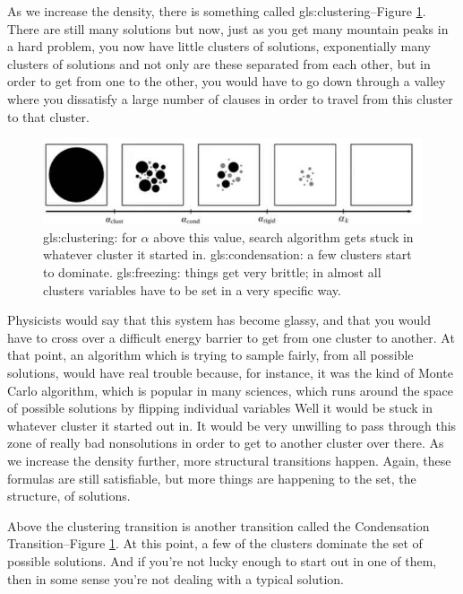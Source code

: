 \documentclass[]{article}
\begin{document}
As we increase the density, there is something called \gls{gls:clustering}--Figure \ref{fig:clustering-transition}. There are still many solutions but now, just as you get many mountain peaks in a hard problem, you now have little clusters of solutions, exponentially many clusters of solutions and not only are these separated from each other, but in order to get from one to the other, you would have to go down through a valley where you  dissatisfy a large number of clauses in order to travel from this cluster to that cluster.


\begin{figure}[H]
	\caption[Clustering, Freezing, and Hardness]{\gls{gls:clustering}: for $\alpha$ above this value, search algorithm gets stuck in whatever cluster it started in. \gls{gls:condensation}: a few clusters start to dominate. \gls{gls:freezing}: things get very brittle; in almost all clusters variables have to be set in a very specific way.}\label{fig:clustering-transition}
	\includegraphics[width=\textwidth]{clustering-transition}
\end{figure}



Physicists would say that this system has become glassy, and that you would have to cross over a difficult energy barrier to get from one cluster to another.
At that point, an algorithm which is trying to sample fairly, from all possible solutions, would have real trouble because, for instance, it was the kind of Monte Carlo algorithm, which is popular in many sciences, which runs around the space of possible solutions by flipping individual variables
Well it would be stuck in whatever cluster it started out in.
It would be very unwilling to pass through this zone of really bad nonsolutions in order to get to another cluster over there.
As we increase the density further, more structural transitions happen.
Again, these formulas are still satisfiable, but more things are happening to the set,
the structure, of solutions.

Above the clustering transition is another transition called the Condensation Transition--Figure \ref{fig:clustering-transition}.
At this point, a few of the clusters
dominate the set of possible solutions.
And if you're not lucky enough to start
out in one of them,
then in some sense you're not dealing
with a typical solution.
\end{document}
